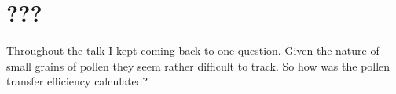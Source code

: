\documentclass[12pt]{article}
\begin{document}

\section{???}

Throughout the talk I kept coming back to one question. Given the nature of small grains of pollen they seem rather difficult to track. So how was the pollen transfer efficiency calculated?


{}

\end{document}
